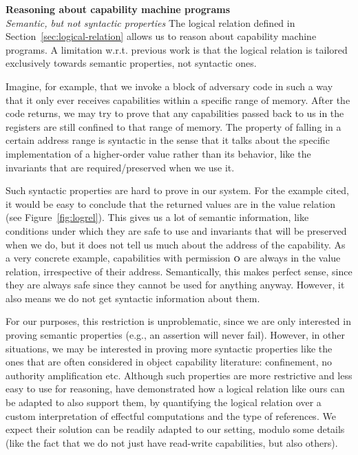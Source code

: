 \documentclass[format=acmsmall, review=true, screen=true]{acmart}
\renewcommand{\figurename}{Figure}
\renewcommand{\sectionname}{Section}
\newcommand{\plainperm}[1]{\textsc{#1}}
\newcommand{\noperm}{\plainperm{o}}
\newenvironment{toplas}{}{}
\begin{document}
\begin{toplas}
\noindent \textbf{Reasoning about capability machine programs}\\
\emph{Semantic, but not syntactic properties} The logical relation defined in
\sectionname~\ref{sec:logical-relation} allows us to reason about capability machine
programs. A limitation w.r.t. previous work is that the logical relation is
tailored exclusively towards semantic properties, not syntactic ones.

Imagine, for example, that we invoke a block of adversary code in such a way
that it only ever receives capabilities within a specific range of memory. After
the code returns, we may try to prove that any capabilities passed back to us in
the registers are still confined to that range of memory. The property of
falling in a certain address range is syntactic in the sense that it talks about
the specific implementation of a higher-order value rather than its behavior,
like the invariants that are required/preserved when we use it.

Such syntactic properties are hard to prove in our system. For the example
cited, it would be easy to conclude that the returned values are in the value
relation (see \figurename~\ref{fig:logrel}). This gives us a lot of semantic
information, like conditions under which they are safe to use and invariants
that will be preserved when we do, but it does not tell us much about the
address of the capability. As a very concrete example, capabilities with
permission $\noperm$ are always in the value relation, irrespective of their
address. Semantically, this makes perfect sense, since they are always safe
since they cannot be used for anything anyway. However, it also means we do not
get syntactic information about them.

For our purposes, this restriction is unproblematic, since we are only
interested in proving semantic properties (e.g., an assertion will never fail).
However, in other situations, we may be interested in proving more syntactic
properties like the ones that are often considered in object capability
literature: confinement, no authority amplification etc. Although such
properties are more restrictive and less easy to use for reasoning,
\citet{Devriese:2016ObjCap} have demonstrated how a logical relation like
ours can be adapted to also support them, by quantifying the logical relation
over a custom interpretation of effectful computations and the type of
references. We expect their solution can be readily adapted to our setting,
modulo some details (like the fact that we do not just have read-write
capabilities, but also others).
\end{toplas}
\end{document}
